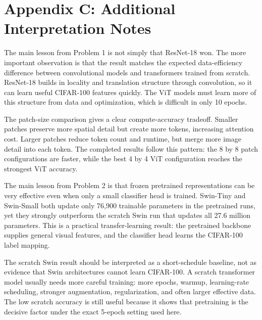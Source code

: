\documentclass[11pt]{article}
\begin{document}
\section*{Appendix C: Additional Interpretation Notes}
The main lesson from Problem 1 is not simply that ResNet-18 won. The more important observation is that the result matches the expected data-efficiency difference between convolutional models and transformers trained from scratch. ResNet-18 builds in locality and translation structure through convolution, so it can learn useful CIFAR-100 features quickly. The ViT models must learn more of this structure from data and optimization, which is difficult in only 10 epochs.

The patch-size comparison gives a clear compute-accuracy tradeoff. Smaller patches preserve more spatial detail but create more tokens, increasing attention cost. Larger patches reduce token count and runtime, but merge more image detail into each token. The completed results follow this pattern: the 8 by 8 patch configurations are faster, while the best 4 by 4 ViT configuration reaches the strongest ViT accuracy.

The main lesson from Problem 2 is that frozen pretrained representations can be very effective even when only a small classifier head is trained. Swin-Tiny and Swin-Small both update only 76,900 trainable parameters in the pretrained runs, yet they strongly outperform the scratch Swin run that updates all 27.6 million parameters. This is a practical transfer-learning result: the pretrained backbone supplies general visual features, and the classifier head learns the CIFAR-100 label mapping.

The scratch Swin result should be interpreted as a short-schedule baseline, not as evidence that Swin architectures cannot learn CIFAR-100. A scratch transformer model usually needs more careful training: more epochs, warmup, learning-rate scheduling, stronger augmentation, regularization, and often larger effective data. The low scratch accuracy is still useful because it shows that pretraining is the decisive factor under the exact 5-epoch setting used here.
\end{document}
